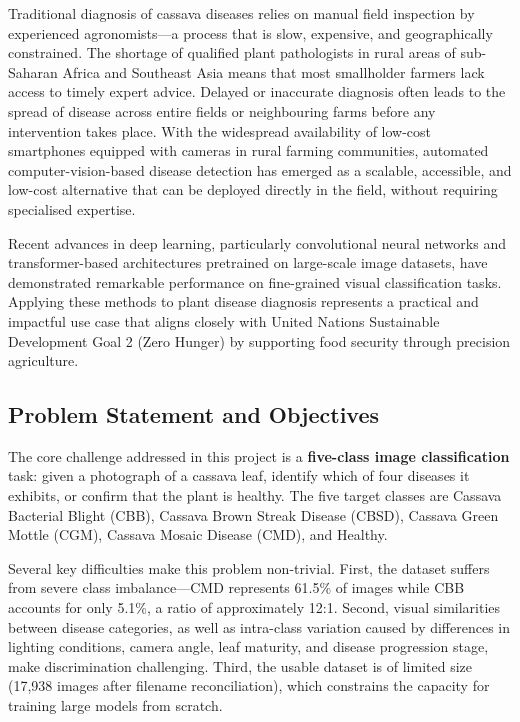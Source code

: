 \documentclass[12pt,a4paper]{article}
\begin{document}
Traditional diagnosis of cassava diseases relies on manual field inspection by experienced agronomists---a process that is slow, expensive, and geographically constrained. The shortage of qualified plant pathologists in rural areas of sub-Saharan Africa and Southeast Asia means that most smallholder farmers lack access to timely expert advice. Delayed or inaccurate diagnosis often leads to the spread of disease across entire fields or neighbouring farms before any intervention takes place. With the widespread availability of low-cost smartphones equipped with cameras in rural farming communities, automated computer-vision-based disease detection has emerged as a scalable, accessible, and low-cost alternative that can be deployed directly in the field, without requiring specialised expertise.

Recent advances in deep learning, particularly convolutional neural networks and transformer-based architectures pretrained on large-scale image datasets, have demonstrated remarkable performance on fine-grained visual classification tasks. Applying these methods to plant disease diagnosis represents a practical and impactful use case that aligns closely with United Nations Sustainable Development Goal 2 (Zero Hunger) by supporting food security through precision agriculture.

\subsection{Problem Statement and Objectives}

The core challenge addressed in this project is a \textbf{five-class image classification} task: given a photograph of a cassava leaf, identify which of four diseases it exhibits, or confirm that the plant is healthy. The five target classes are Cassava Bacterial Blight (CBB), Cassava Brown Streak Disease (CBSD), Cassava Green Mottle (CGM), Cassava Mosaic Disease (CMD), and Healthy.

Several key difficulties make this problem non-trivial. First, the dataset suffers from severe class imbalance---CMD represents 61.5\% of images while CBB accounts for only 5.1\%, a ratio of approximately 12:1. Second, visual similarities between disease categories, as well as intra-class variation caused by differences in lighting conditions, camera angle, leaf maturity, and disease progression stage, make discrimination challenging. Third, the usable dataset is of limited size (17,938 images after filename reconciliation), which constrains the capacity for training large models from scratch.
\end{document}
